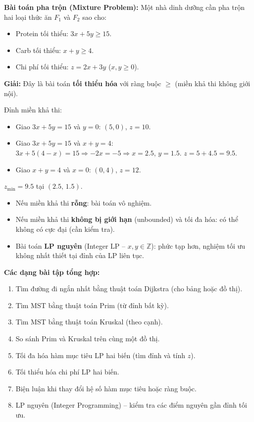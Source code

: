 \documentclass[12pt,a4paper]{article}
\begin{document}
\begin{vidu}
  \textbf{Bài toán pha trộn (Mixture Problem):}
  Một nhà dinh dưỡng cần pha trộn hai loại thức ăn $F_1$ và $F_2$ sao cho:
  \begin{itemize}
    \item Protein tối thiểu: $3x + 5y \ge 15$.
    \item Carb tối thiểu: $x + y \ge 4$.
    \item Chi phí tối thiểu: $z = 2x + 3y$ ($x, y \ge 0$).
  \end{itemize}

  \medskip\textbf{Giải:}
  Đây là bài toán \textbf{tối thiểu hóa} với ràng buộc $\ge$ (miền khả thi không giới nội).

  Đỉnh miền khả thi:
  \begin{itemize}
    \item Giao $3x+5y=15$ và $y=0$: $(5, 0)$, $z=10$.
    \item Giao $3x+5y=15$ và $x+y=4$: $3x+5(4-x)=15 \Rightarrow -2x=-5 \Rightarrow x=2.5$, $y=1.5$. $z=5+4.5=9.5$.
    \item Giao $x+y=4$ và $x=0$: $(0,4)$, $z=12$.
  \end{itemize}

  $z_{\min} = 9.5$ tại $(2.5,\, 1.5)$.
\end{vidu}

\begin{luuy}
  \begin{itemize}
    \item Nếu miền khả thi \textbf{rỗng}: bài toán vô nghiệm.
    \item Nếu miền khả thi \textbf{không bị giới hạn} (unbounded) và tối đa hóa: có thể không có cực đại (cần kiểm tra).
    \item Bài toán \textbf{LP nguyên} (Integer LP -- $x, y \in \mathbb{Z}$): phức tạp hơn, nghiệm tối ưu không nhất thiết tại đỉnh của LP liên tục.
  \end{itemize}
\end{luuy}

\medskip\noindent\textbf{Các dạng bài tập tổng hợp:}
\begin{enumerate}[label=\textbf{Dạng \arabic*:}, leftmargin=*, align=left]
  \item Tìm đường đi ngắn nhất bằng thuật toán Dijkstra (cho bảng hoặc đồ thị).
  \item Tìm MST bằng thuật toán Prim (từ đỉnh bất kỳ).
  \item Tìm MST bằng thuật toán Kruskal (theo cạnh).
  \item So sánh Prim và Kruskal trên cùng một đồ thị.
  \item Tối đa hóa hàm mục tiêu LP hai biến (tìm đỉnh và tính $z$).
  \item Tối thiểu hóa chi phí LP hai biến.
  \item Biện luận khi thay đổi hệ số hàm mục tiêu hoặc ràng buộc.
  \item LP nguyên (Integer Programming) -- kiểm tra các điểm nguyên gần đỉnh tối ưu.
\end{enumerate}
\end{document}
